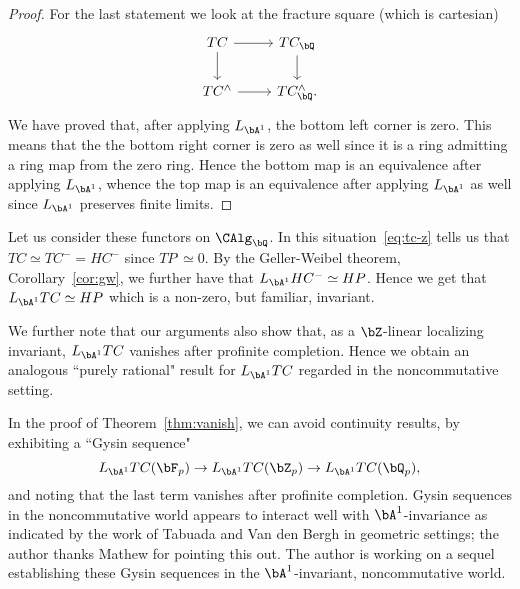 \documentclass[a4paper,10pt]{amsart}
\begin{document}
\begin{proof}
For the last statement we look at the fracture square (which is cartesian)
\[
\begin{tikzcd}
TC \ar{r} \ar{d} & TC_{\bQ}\ar{d}\\
TC^{\comp} \ar{r} & TC^{\comp}_{\bQ}.
\end{tikzcd}
\]
We have proved that, after applying $L_{\bA^1}$, the bottom left corner is zero. This means that the the bottom right corner is zero as well since it is a ring admitting a ring map from the zero ring. Hence the bottom map is an equivalence after applying $L_{\bA^1}$, whence the top map is an equivalence after applying $L_{\bA^1}$ as well since $L_{\bA^1}$ preserves finite limits.
\end{proof}

 Let us consider these functors on $\CAlg_{\bQ}$. In this situation~\eqref{eq:tc-z} tells us that $TC \simeq TC^- = HC^-$ since $TP^{\comp} \simeq 0$. By the Geller-Weibel theorem, Corollary~\ref{cor:gw}, we further have that $L_{\bA^1}HC^- \simeq HP$. Hence we get that $L_{\bA^1}TC \simeq HP$ which is a non-zero, but familiar, invariant.

\sssec{}\label{rem:ncworld} We further note that our arguments also show that, as a $\bZ$-linear localizing invariant, $L_{\bA^1}TC$ vanishes after profinite completion. Hence we obtain an analogous ``purely rational" result for $L_{\bA^1}TC$ regarded in the noncommutative setting.

\sssec{}\label{nc-a1} In the proof of Theorem~\ref{thm:vanish}, we can avoid continuity results, by exhibiting a ``Gysin sequence" 
\[
L_{\bA^1}TC(\bF_p) \rightarrow L_{\bA^1}TC(\bZ_p) \rightarrow L_{\bA^1}TC(\bQ_p),
\]
and noting that the last term vanishes after profinite completion. Gysin sequences in the noncommutative world appears to interact well with $\bA^1$-invariance as indicated by the work of Tabuada and Van den Bergh \cite{tabuada-vdb} in geometric settings; the author thanks Mathew for pointing this out. The author is working on a sequel establishing these Gysin sequences in the $\bA^1$-invariant, noncommutative world.





\let\mathbb=\mathbf

{\small

}

\parskip 0pt
\end{document}
